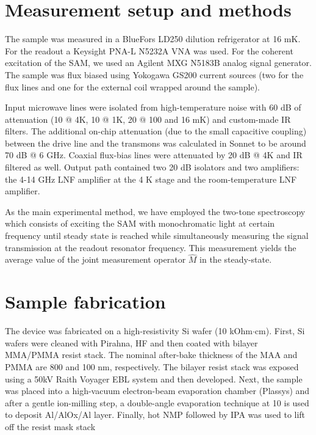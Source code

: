 \documentclass[%
 prx,
 amsmath,amssymb,
 reprint,%
]{revtex4-1}
\begin{document}
\section{Measurement setup and methods}\label{sec:meas_setup}
The sample was measured in a BlueFors LD250 dilution refrigerator at 16 mK. For the readout a Keysight PNA-L N5232A VNA was used. For the coherent excitation of the SAM, we used an Agilent MXG N5183B analog signal generator. The sample was 
flux biased using Yokogawa GS200 current sources (two for the flux lines and one for the external coil wrapped around the sample).

Input microwave lines were isolated from high-temperature noise with 60 dB of attenuation (10 @ 4K, 10 @ 1K, 20 @ 100 and 16 mK) and custom-made IR filters. The additional on-chip attenuation (due to the small capacitive coupling) between the drive line and the transmons was calculated in Sonnet to be around 70 dB @ 6 GHz. Coaxial flux-bias lines were attenuated by 20 dB @ 4K and IR filtered as well. Output path contained two 20 dB isolators and two amplifiers: the 4-14 GHz LNF amplifier at the 4 K stage and the room-temperature LNF amplifier.

As the main experimental method, we have employed the two-tone spectroscopy which consists of exciting the SAM with monochromatic light at certain frequency until steady state is reached while simultaneously measuring the signal transmission at the readout resonator frequency. This measurement yields the average value of the joint measurement operator $\hat M$ in the steady-state.

\section{Sample fabrication}\label{sec:fab}
The device was fabricated on a high-resistivity
Si wafer (10 kOhm$\cdot$cm). First, Si wafers were cleaned with Pirahna, HF and then coated with bilayer MMA/PMMA resist stack. The nominal after-bake thickness of the MAA and PMMA are 800 and 100 nm, respectively. The
bilayer resist stack was exposed using a 50kV Raith Voyager EBL system and then developed. Next, the sample was placed into a high-vacuum electron-beam evaporation
chamber (Plassys) and after a gentle ion-milling step, a double-angle evaporation technique at 10 is used to deposit Al/AlOx/Al layer. Finally, hot NMP followed by IPA was used to lift off the resist mask stack

\end{document}
